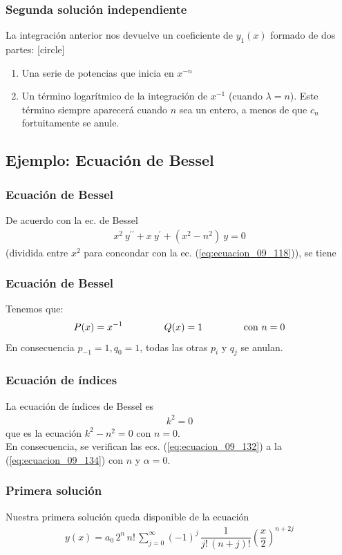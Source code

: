 \begin{frame}
\frametitle{Segunda solución independiente}
La integración anterior nos devuelve un coeficiente de $y_{1}(x)$ formado de dos partes:
[circle]
\begin{enumerate}[<+->]
\item Una serie de potencias que inicia en $x^{-n}$
\item Un término logarítmico de la integración de $x^{-1}$ (cuando $\lambda=n$). Este término siempre aparecerá cuando $n$ sea un entero, a menos de que $c_{n}$ fortuitamente se anule.
\end{enumerate}
\end{frame}
\subsection{Ejemplo: Ecuación de Bessel}
\begin{frame}
\frametitle{Ecuación de Bessel}
De acuerdo con la ec. de Bessel 
\begin{align}
x^{2} \: y^{\prime \prime} + x \: y^{\prime} + (x^{2} - n^{2}) \: y = 0
\label{eq:ecuacion_09_100}
\end{align}
(dividida entre $x^{2}$ para concondar con la ec. (\ref{eq:ecuacion_09_118})), se tiene
\end{frame}
\begin{frame}
\frametitle{Ecuación de Bessel}
Tenemos que:
\begin{align*}
P(x) = x^{-1} \hspace{1.5cm} Q(x) = 1 \hspace{1.5cm} \text{con } n = 0
\end{align*}
 En consecuencia $p_{-1} = 1, q_{0} = 1$, todas las otras $p_{i}$ y $q_{j}$ se anulan.
\end{frame}
\begin{frame}
\frametitle{Ecuación de índices}
La ecuación de índices de Bessel es
\begin{align*}
k^{2} = 0
\end{align*}
que es la ecuación $k^{2} - n^{2} = 0$ con $n = 0$.
\\
\bigskip
\pause
En consecuencia, se verifican las ecs. (\ref{eq:ecuacion_09_132}) a la (\ref{eq:ecuacion_09_134}) con $n$ y $\alpha = 0$.
\end{frame}
\begin{frame}
\frametitle{Primera solución}
Nuestra primera solución queda disponible de la ecuación
\begin{align}
y(x) = a_{0} \, 2^{n} \, n! \, \sum_{j=0}^{\infty} (-1)^{j} \, \dfrac{1}{j! \, (n + j)!} \left( \dfrac{x}{2} \right)^{n +2j}
\label{eq:ecuacion_09_108}
\end{align}
\end{frame}
